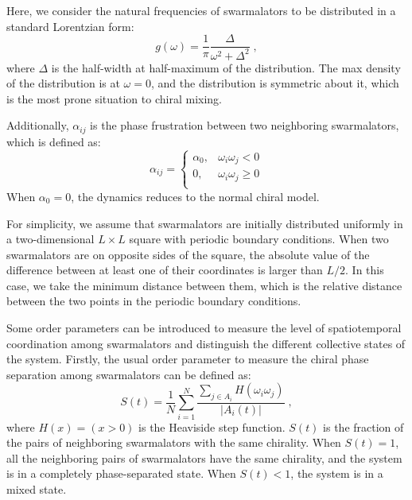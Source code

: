 \documentclass{article}
\begin{document}
Here, we consider the natural frequencies of swarmalators to be distributed in a standard Lorentzian form:
\begin{equation}
    \label{eq:lorentzian}
    g\left( \omega \right) =\frac{1}{\pi}\frac{\Delta}{\omega ^2+\Delta ^2}\;,
\end{equation}
where $\Delta$ is the half-width at half-maximum of the distribution. The max density of the distribution is at $\omega=0$, and the distribution is symmetric about it, which is the most prone situation to chiral mixing.

Additionally, $\alpha_{ij}$ is the phase frustration between two neighboring swarmalators, which is defined as:
\begin{equation}
    \alpha _{ij}=\begin{cases}
        \alpha _0,&		\omega _i\omega _j<0\\
        0,&		\omega _i\omega _j\geqslant 0\\
    \end{cases}
\end{equation}
When $\alpha_0=0$, the dynamics reduces to the normal chiral model.

For simplicity, we assume that swarmalators are initially distributed uniformly in a two-dimensional $L\times L$ square with periodic boundary conditions. When two swarmalators are on opposite sides of the square, the absolute value of the difference between at least one of their coordinates is larger than $L/2$. In this case, we take the minimum distance between them, which is the relative distance between the two points in the periodic boundary conditions.

Some order parameters can be introduced to measure the level of spatiotemporal coordination among swarmalators and distinguish the different collective states of the system. Firstly, the usual order parameter to measure the chiral phase separation among swarmalators can be defined as:
\begin{equation}
    S\left( t \right) =\frac{1}{N}\sum_{i=1}^N{\frac{\sum_{j\in A_i}{H\left( \omega _i\omega _j \right)}}{\left| A_i\left( t \right) \right|}}\;,
\end{equation}
where $H\left( x \right) =\left( x>0 \right)$ is the Heaviside step function. $S\left( t \right)$ is the fraction of the pairs of neighboring swarmalators with the same chirality. When $S\left( t \right)=1$, all the neighboring pairs of swarmalators have the same chirality, and the system is in a completely phase-separated state. When $S\left( t \right)< 1$, the system is in a mixed state.
\end{document}
